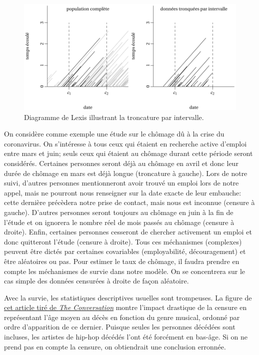 \documentclass[
  11pt,
  letterpaper,
]{scrbook}
\theoremstyle{definition}
\theoremstyle{remark}
\begin{document}
\begin{figure}[ht!]

{\centering \includegraphics[width=1\textwidth,height=\textheight]{figures/lexis_troncationintervalle.pdf}

}

\caption{\label{fig-troncatureintervalle}Diagramme de Lexis illustrant
la troncature par intervalle.}

\end{figure}

On considère comme exemple une étude sur le chômage dû à la crise du
coronavirus. On s'intéresse à tous ceux qui étaient en recherche active
d'emploi entre mars et juin; seuls ceux qui étaient au chômage durant
cette période seront considérés. Certaines personnes seront déjà au
chômage en avril et donc leur durée de chômage en mars est déjà longue
(troncature à gauche). Lors de notre suivi, d'autres personnes
mentionneront avoir trouvé un emploi lors de notre appel, mais ne
pourront nous renseigner sur la date exacte de leur embauche: cette
dernière précèdera notre prise de contact, mais nous est inconnue
(censure à gauche). D'autres personnes seront toujours au chômage en
juin à la fin de l'étude et on ignorera le nombre réel de mois passés au
chômage (censure à droite). Enfin, certaines personnes cesseront de
chercher activement un emploi et donc quitteront l'étude (censure à
droite). Tous ces méchanismes (complexes) peuvent être dictés par
certaines covariables (employabilité, découragement) et être aléatoires
ou pas. Pour estimer le taux de chômage, il faudra prendre en compte les
méchanismes de survie dans notre modèle. On se concentrera sur le cas
simple des données censurées à droite de façon aléatoire.

Avec la survie, les statistiques descriptives usuelles sont trompeuses.
La figure de
\href{https://theconversation.com/music-to-die-for-how-genre-affects-popular-musicians-life-expectancy-36660}{cet
article tiré de \emph{The Conversation}} montre l'impact drastique de la
censure en représentant l'âge moyen au décès en fonction du genre
musical, ordonné par ordre d'apparition de ce dernier. Puisque seules
les personnes décédées sont incluses, les artistes de hip-hop décédés
l'ont été forcément en bas-âge. Si on ne prend pas en compte la censure,
on obtiendrait une conclusion erronnée.
\end{document}
